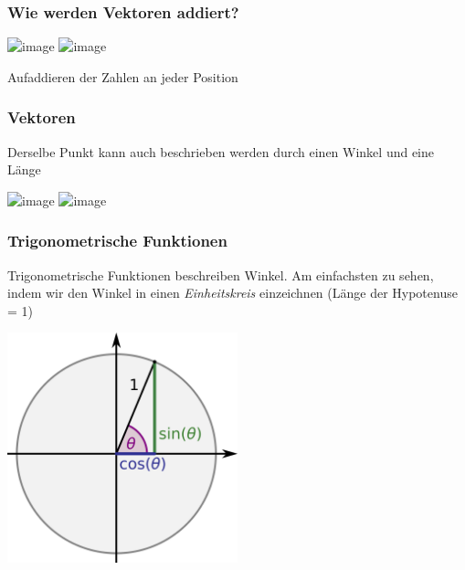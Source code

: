 \documentclass{beamer}
\begin{document}
\begin{frame}
\frametitle{Wie werden Vektoren addiert?}



\begin{center}
\includegraphics<1>[width=0.6\textwidth]{vectors.png}
\includegraphics<2>[width=0.6\textwidth]{vectors_additon.png}
\end{center}

\pause

Aufaddieren der Zahlen an jeder Position


\end{frame}



\begin{frame}
\frametitle{Vektoren}

Derselbe Punkt kann auch beschrieben werden durch einen Winkel und eine Länge


\begin{center}
\includegraphics<1>[width=0.6\textwidth]{vectors.png}
\includegraphics<2>[width=0.6\textwidth]{vectors_winkel.png}
\end{center}



\end{frame}



\begin{frame}
\frametitle{Trigonometrische Funktionen}

Trigonometrische Funktionen beschreiben Winkel. Am einfachsten zu sehen, indem wir den Winkel in einen \emph{Einheitskreis} einzeichnen (Länge der Hypotenuse = 1)

\begin{center}
\includegraphics[width=0.5\textwidth]{Einheitskreis.png}
\end{center}



\end{frame}
\end{document}
